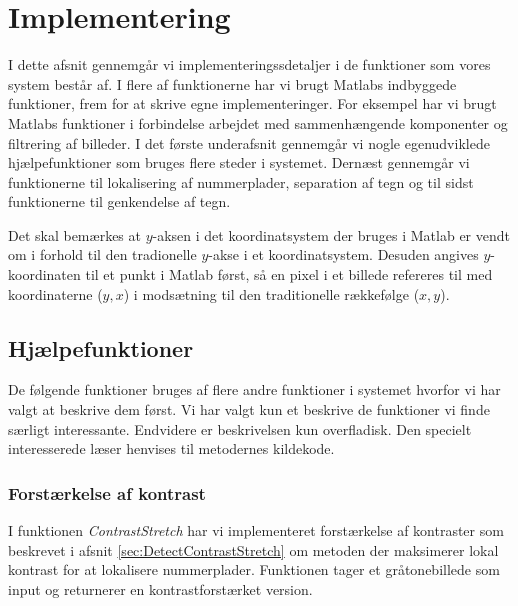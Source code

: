 \section{Implementering}
\label{sec:implementation}

I dette afsnit gennemgår vi implementeringssdetaljer i de funktioner som vores system består af. I flere af funktionerne har vi brugt Matlabs indbyggede funktioner, frem for at skrive egne implementeringer. For eksempel har vi brugt Matlabs funktioner i forbindelse arbejdet med sammenhængende komponenter og filtrering af billeder. I det første underafsnit gennemgår vi nogle egenudviklede hjælpefunktioner som bruges flere steder i systemet. Dernæst gennemgår vi funktionerne til lokalisering af nummerplader, separation af tegn og til sidst funktionerne til genkendelse af tegn.

Det skal bemærkes at $y$-aksen i det koordinatsystem der bruges i Matlab er vendt om i forhold til den tradionelle $y$-akse i et koordinatsystem. Desuden angives $y$-koordinaten til et punkt i Matlab først, så en pixel i et billede refereres til med koordinaterne ($y,x$) i modsætning til den traditionelle rækkefølge ($x,y$).




\subsection{Hjælpefunktioner}
\label{sec:imp:hjaelpefunktioner}
De følgende funktioner bruges af flere andre funktioner i systemet hvorfor vi har valgt at beskrive dem først. Vi har valgt kun et beskrive de funktioner vi finde særligt interessante. Endvidere er beskrivelsen kun overfladisk. Den specielt interesserede læser henvises til metodernes kildekode.

\subsubsection{Forstærkelse af kontrast}
\label{sec:imp:ContrastStrech}
I funktionen \textit{ContrastStretch} har vi implementeret forstærkelse af kontraster som beskrevet i afsnit \vref{sec:DetectContrastStretch} om metoden der maksimerer lokal kontrast for at lokalisere nummerplader. Funktionen tager et gråtonebillede som input og returnerer en kontrastforstærket version. 


